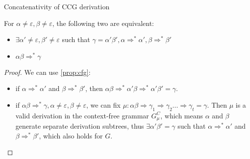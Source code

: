 \documentclass[main.tex]{subfiles}
\begin{document}
\begin{prop}\label{prop:concat}
    Concatenativity of CCG derivation

    For $\alpha \neq \varepsilon, \beta \neq \varepsilon$, the following two are equivalent:
    \begin{itemize}

        \item $\exists \alpha' \neq \varepsilon, \beta' \neq \varepsilon$
            such that $\gamma = \alpha' \beta', \alpha \Rightarrow^* \alpha', \beta \Rightarrow^* \beta'$
        \item $\alpha \beta \Rightarrow^* \gamma$
    \end{itemize}
\end{prop}
\begin{proof}
    We can use \cref{prop:cfg}:

    \begin{itemize}
        \item if $\alpha \Rightarrow^* \alpha'$ and $\beta \Rightarrow^* \beta'$,
            then $\alpha \beta \Rightarrow^* \alpha' \beta \Rightarrow^* \alpha' \beta' = \gamma$.
        \item if $\alpha \beta \Rightarrow^* \gamma, \alpha \neq \varepsilon, \beta \neq \varepsilon$,
            we can fix $\mu: \alpha \beta \Rightarrow \gamma_1 \Rightarrow \gamma_2 ... \Rightarrow \gamma_t = \gamma$.
            Then $\mu$ is a valid derivation in the context-free grammar $G^C_{\mu}$,
            which means $\alpha$ and $\beta$ generate separate derivation
            subtrees, thus $\exists \alpha' \beta' = \gamma$ such that
            $\alpha \Rightarrow^* \alpha'$ and $\beta \Rightarrow^* \beta'$,
            which also holds for $G$.
    \end{itemize}
\end{proof}
\end{document}
